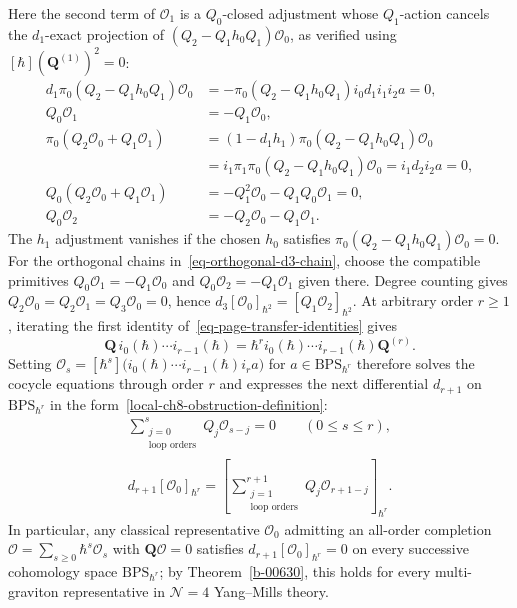 \documentclass[11pt]{article}
\numberwithin{equation}{section}
\numberwithin{figure}{section}
\numberwithin{table}{section}
\begin{document}
Here the second term of $\mathcal O_1$ is a $Q_0$-closed adjustment whose $Q_1$-action cancels the $d_1$-exact projection of $(Q_2-Q_1h_0Q_1)\mathcal O_0$, as verified using $[\hbar](\mathbf Q^{(1)})^2=0$:
\begin{equation}\label{eq-two-loop-representative-projection}
\begin{aligned}
d_1\pi_0(Q_2-Q_1h_0Q_1)\mathcal O_0
&=-\pi_0(Q_2-Q_1h_0Q_1)i_0d_1i_1i_2a=0,\\
Q_0\mathcal O_1&=-Q_1\mathcal O_0,\\
\pi_0(Q_2\mathcal O_0+Q_1\mathcal O_1)
&=(1-d_1h_1)\pi_0(Q_2-Q_1h_0Q_1)\mathcal O_0\\
&=i_1\pi_1\pi_0(Q_2-Q_1h_0Q_1)\mathcal O_0=i_1d_2i_2a=0,\\
Q_0(Q_2\mathcal O_0+Q_1\mathcal O_1)
&=-Q_1^2\mathcal O_0-Q_1Q_0\mathcal O_1=0,\\
Q_0\mathcal O_2&=-Q_2\mathcal O_0-Q_1\mathcal O_1.
\end{aligned}
\end{equation}
The $h_1$ adjustment vanishes if the chosen $h_0$ satisfies $\pi_0(Q_2-Q_1h_0Q_1)\mathcal O_0=0$. For the orthogonal chains in~\eqref{eq-orthogonal-d3-chain}, choose the compatible primitives $Q_0\mathcal O_1=-Q_1\mathcal O_0$ and $Q_0\mathcal O_2=-Q_1\mathcal O_1$ given there. Degree counting gives $Q_2\mathcal O_0=Q_2\mathcal O_1=Q_3\mathcal O_0=0$, hence $d_3[\mathcal O_0]_{\hbar^2}=[Q_1\mathcal O_2]_{\hbar^2}$.
At arbitrary order $r\ge1$, iterating the first identity of~\eqref{eq-page-transfer-identities} gives
\begin{equation}\label{eq-page-representative-chain}
\mathbf Q\,i_0(\hbar)\cdots i_{r-1}(\hbar)
=\hbar^r i_0(\hbar)\cdots i_{r-1}(\hbar)\mathbf Q^{(r)}.
\end{equation}
Setting $\mathcal O_s=[\hbar^s]\bigl(i_0(\hbar)\cdots i_{r-1}(\hbar)i_ra\bigr)$ for $a\in\mathrm{BPS}_{\hbar^r}$ therefore solves the cocycle equations through order $r$ and expresses the next differential $d_{r+1}$ on $\mathrm{BPS}_{\hbar^r}$ in the form~\eqref{local-ch8-obstruction-definition}:
\begin{equation}\label{eq-2-75}
\begin{gathered}
\sum_{\substack{j=0\\\text{loop orders}}}^{s}Q_j\mathcal O_{s-j}=0
\qquad(0\le s\le r),\\
d_{r+1}[\mathcal O_0]_{\hbar^r}
=\left[\sum_{\substack{j=1\\\text{loop orders}}}^{r+1}Q_j\mathcal O_{r+1-j}\right]_{\hbar^r}.
\end{gathered}
\end{equation}
In particular, any classical representative $\mathcal O_0$ admitting an all-order completion $\mathcal O=\sum_{s\ge0}\hbar^s\mathcal O_s$ with $\mathbf Q\mathcal O=0$ satisfies $d_{r+1}[\mathcal O_0]_{\hbar^r}=0$ on every successive cohomology space $\mathrm{BPS}_{\hbar^r}$; by Theorem~\ref{b-00630}, this holds for every multi-graviton representative in $\mathcal N=4$ Yang--Mills theory.
\end{document}
